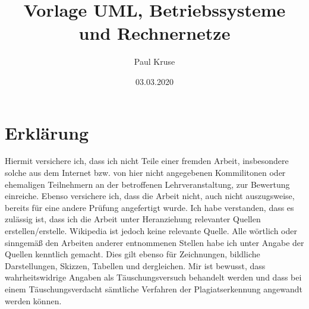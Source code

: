 \documentclass{Gharaei}
\title{Vorlage UML, Betriebssysteme und Rechnernetze}
\author{Paul Kruse}
\date{03.03.2020}
\begin{document}
\maketitle
\newpage
\thispagestyle{empty}
\tableofcontents
\setcounter{page}{1}
\newpage

\newpage

\section {Erklärung}
Hiermit versichere ich, dass ich nicht Teile einer fremden Arbeit, insbesondere solche aus dem Internet bzw. von hier nicht angegebenen Kommilitonen oder ehemaligen Teilnehmern an der betroffenen Lehrveranstaltung, zur Bewertung einreiche. Ebenso versichere ich, dass die Arbeit nicht, auch nicht auszugsweise, bereits für eine andere Prüfung angefertigt wurde. Ich habe verstanden, dass es zulässig ist, dass ich die Arbeit unter Heranziehung relevanter Quellen erstellen/erstelle. Wikipedia ist jedoch keine relevante Quelle. Alle wörtlich oder sinngemäß den Arbeiten anderer entnommenen Stellen habe ich unter Angabe der Quellen kenntlich gemacht. Dies gilt ebenso für Zeichnungen, bildliche Darstellungen, Skizzen, Tabellen und dergleichen.  Mir ist bewusst, dass wahrheitswidrige Angaben als Täuschungsversuch behandelt werden und dass bei einem Täuschungsverdacht sämtliche Verfahren der Plagiatserkennung angewandt werden können.
\end{document}
